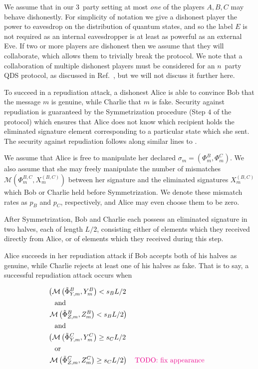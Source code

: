 We assume that in our $3$~party setting at most \emph{one} of the players $A, B, C$ may behave dishonestly. For simplicity of notation we give a dishonest player the power to eavesdrop on the distribution of quantum states, and so the label $E$ is not required as an internal eavesdropper is at least as powerful as an external Eve. If two or more players are dishonest then we assume that they will collaborate, which allows them to trivially break the protocol. We note that a collaboration of multiple dishonest players must be considered for an $n$~party QDS protocol, as discussed in Ref.~, but we will not discuss it further here.

To succeed in a repudiation attack, a dishonest Alice is able to convince Bob that the message $m$ is genuine, while Charlie that $m$ is fake. Security against repudiation is guaranteed by the Symmetrization procedure (Step $4$ of the protocol) which ensures that Alice does not know which recipient holds the eliminated signature element corresponding to a particular state which she sent. The security against repudiation follows along similar lines to .

We assume that Alice is free to manipulate her declared $\sigma_m = \left(\Phi_m^B, \Phi_m^C\right)$. We also assume that she may freely manipulate the number of mismatches $\mathcal{M}\left(\Phi_m^{B, C}, X_m^{\left(B, C\right)}\right)$ between her signature and the eliminated signatures $X_m^{\left(B, C\right)}$ which Bob or Charlie held before Symmetrization. We denote these mismatch rates as $p_B$ and $p_C$, respectively, and Alice may even choose them to be zero.

After Symmetrization, Bob and Charlie each possess an eliminated signature in two halves, each of length $L/2$, consisting either of elements which they received directly from Alice, or of elements which they received during this step. 

Alice succeeds in her repudiation attack if Bob accepts both of his halves as genuine, while Charlie rejects at least one of his halves as fake. That is to say, a successful repudiation attack occurs when

\begin{align}\label{eqn:repudiation_events}
&\left(\mathcal{M}\left(\tilde{\Phi}_{Y, m}^B, Y_m^B\right) < s_B L/2 \right. \notag\\
&\qq{and} \notag \\
&\left.\mathcal{M}\left(\tilde{\Phi}_{Z, m}^B, Z_m^B\right) < s_B L/2 \right) \notag \\
&\qq{and} \notag \\
&\left(\mathcal{M}\left(\tilde{\Phi}_{Y, m}^C, Y_m^C\right) \ge s_C L/2 \right. \notag \\
&\qq{or} \notag \\
&\left.\mathcal{M}\left(\tilde{\Phi}_{Z, m}^C, Z_m^C\right) \ge s_C L/2 \right) \qq{\MT{TODO: fix appearance}}
\end{align}

